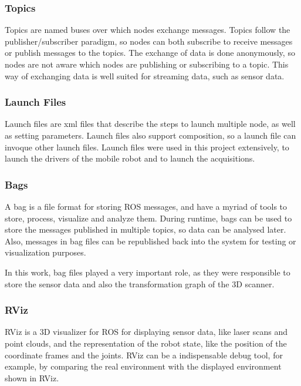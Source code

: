 \subsubsection{Topics}

Topics are named buses over which nodes exchange messages. Topics follow the publisher/subscriber paradigm, so nodes can both subscribe to receive messages or publish messages to the topics. The exchange of data is done anonymously, so nodes are not aware which nodes are publishing or subscribing to a topic. This way of exchanging data is well suited for streaming data, such as sensor data.

\subsubsection{Launch Files}

Launch files are xml files that describe the steps to launch multiple node, as well as setting parameters. Launch files also support composition, so a launch file can invoque other launch files. Launch files were used in this project extensively, to launch the drivers of the mobile robot and to launch the acquisitions.

\subsubsection{Bags}

A bag is a file format for storing ROS messages, and have a myriad of tools to store, process, visualize and analyze them. During runtime, bags can be used to store the messages published in multiple topics, so data can be analysed later. Also, messages in bag files can be republished back into the system for testing or visualization purposes.

In this work, bag files played a very important role, as they were responsible to store the sensor data and also the transformation graph of the 3D scanner.

\subsubsection{RViz}

RViz is a 3D visualizer for ROS for displaying sensor data, like laser scans and point clouds, and the representation of the robot state, like the position of the coordinate frames and the joints. RViz can be a indispensable debug tool, for example, by comparing the real environment with the displayed environment shown in RViz.

